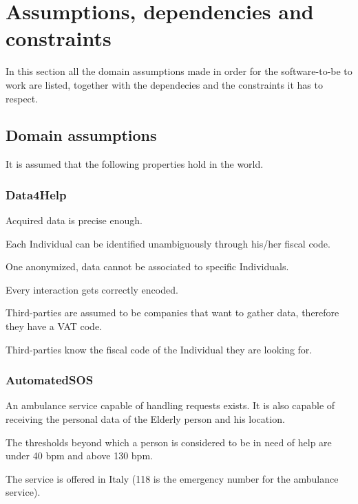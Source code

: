 \section{Assumptions, dependencies and constraints}
    In this section all the domain assumptions made in order for the software-to-be to work are listed, together with the dependecies and the constraints it has to respect.
    
    \subsection{Domain assumptions}
        It is assumed that the following properties hold in the world.
        
        \subsubsection{Data4Help}
        \begin{enumerate}[label={[}D1.\arabic*{]}, leftmargin=*]
            \item Acquired data is precise enough.
            
            \item Each Individual can be identified unambiguously through his/her fiscal code.
            
            \item One anonymized, data cannot be associated to specific Individuals.
            
            \item Every interaction gets correctly encoded.
            
            \item Third-parties are assumed to be companies that want to gather data, therefore they have a VAT code.
            
            \item Third-parties know the fiscal code of the Individual they are looking for.
        \end{enumerate}
        
        \subsubsection{AutomatedSOS}
            \begin{enumerate}[label={[}D2.\arabic*{]}, leftmargin=*]
                \item An ambulance service capable of handling requests exists. It is also capable of receiving the personal data of the Elderly person and his location.
                
                \item \label{Asos-tresholds} The thresholds beyond which a person is considered to be in need of help are under 40 bpm and above 130 bpm.
                
                \item The service is offered in Italy (118 is the emergency number for the ambulance service).
            \end{enumerate}
            
